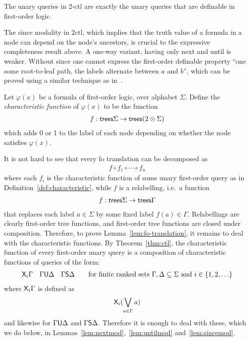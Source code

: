 \begin{theorem} \label{thm:ctl} The unary queries in 2-ctl are exactly the unary queries that are definable in first-order logic.
\end{theorem}

The since modality in 2ctl, which implies that the truth value of a formula in a node can depend on the node's ancestors, is crucial to the  expressive completeness result above. A one-way variant, having only next and until is weaker. Without since one cannot express the first-order definable property ``one some root-to-leaf path, the labels alternate between $a$ and $b$'', which can be proved using a similar technique as in~\cite[Theorem 1]{bojanczyk2008common}. 
\begin{definition}\label{def:characteristic}
    Let $\varphi(x)$ be a formula of first-order logic, over alphabet $\Sigma$. Define the \emph{characteristic function} of $\varphi(x)$ to be the function
            \begin{align*}
                f : \mathsf {trees} \Sigma \to \mathsf {trees} (2 \otimes \Sigma)
            \end{align*}
            which adds 0 or 1 to  the label of each node depending on whether the node satisfies $\varphi(x)$.
\end{definition}


It is not hard to see that every fo translation can be decomposed as 
    \begin{align*}
        f \circ f_1 \circ \cdots \circ f_n
    \end{align*}
    where each $f_i$ is the characteristic function of some unary first-order query as in Definition~\ref{def:characteristic}, while $f$ is a relabelling, i.e.~a function
    \begin{align*}
        f : \mathsf {trees} \Sigma \to \mathsf {trees} \Gamma
    \end{align*}
    that replaces each label $a \in \Sigma$ by some fixed label  $f(a) \in \Gamma$. Relabellings are clearly first-order tree functions, and first-order tree functions are closed under composition. Therefore, to prove Lemma~\ref{lem:fo-translation}, it remains to deal with the characteristic functions. By Theorem~\ref{thm:ctl}, the characteristic function of every first-order unary query is a composition of characteristic functions of queries of the form:
    \begin{align*}
        \mathsf X_i \Gamma \quad \Gamma \mathsf U \Delta \quad \Gamma \mathsf S \Delta \qquad \text{for finite ranked sets $\Gamma,\Delta \subseteq \Sigma$ and $i \in \{1,2,\ldots\}$} 
    \end{align*}
    where $\mathsf X_i \Gamma$ is defined as 
    \begin{align*}
        \mathsf X_i (\bigvee_{a \in \Gamma} a) 
    \end{align*}
    and likewise for $\Gamma \mathsf U \Delta $ and $ \Gamma \mathsf S \Delta$. Therefore it is enough to  deal with these, which we do below, in Lemmas~\ref{lem:nextmod},~\ref{lem:untilmod} and~\ref{lem:sincemod}.



